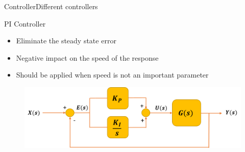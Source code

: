 %
%
%  

%
%
%  

\begin{frame}{Controller}{Different controllers}
  \begin{block}{PI Controller}

	  \begin{itemize}
	  	\item Eliminate the steady state error
	  	\item Negative impact on the speed of the response
	  	\item Should be applied when speed is not an important parameter
	  \end{itemize}

	  \begin{figure}
        \includegraphics[scale=0.26]{../report/figures/PI_controller.png}
      \end{figure}
  
  \end{block}
\end{frame}


